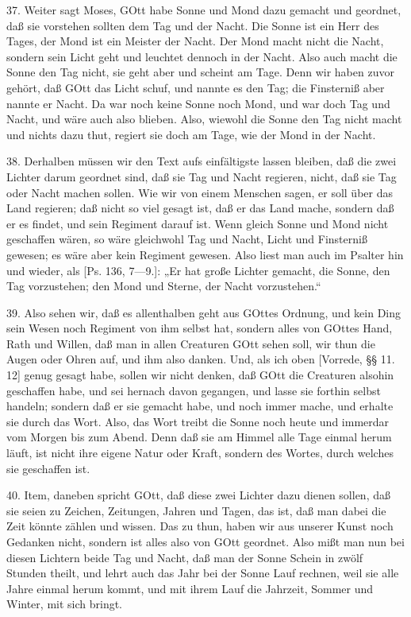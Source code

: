37. Weiter sagt Moses, GOtt habe Sonne und Mond dazu gemacht und geordnet, daß sie vorstehen sollten dem Tag und der Nacht. Die Sonne ist ein Herr des Tages, der Mond ist ein Meister der Nacht. Der Mond macht nicht die Nacht, sondern sein Licht geht und leuchtet dennoch in der Nacht. Also auch macht die Sonne den Tag nicht, sie geht aber und scheint am Tage. Denn wir haben zuvor gehört, daß GOtt das Licht schuf, und nannte es den Tag; die Finsterniß aber nannte er Nacht. Da war noch keine Sonne noch Mond, und war doch Tag und Nacht, und wäre auch also blieben. Also, wiewohl die Sonne den Tag nicht macht und nichts dazu thut, regiert sie doch am Tage, wie der Mond in der Nacht.

38. Derhalben müssen wir den Text aufs einfältigste lassen bleiben, daß die zwei Lichter darum geordnet sind, daß sie Tag und Nacht regieren, nicht, daß sie Tag oder Nacht machen sollen. Wie wir von einem Menschen sagen, er soll über das Land regieren; daß nicht so viel gesagt ist, daß er das Land mache, sondern daß er es findet, und sein Regiment darauf ist. Wenn gleich Sonne und Mond nicht geschaffen wären, so wäre gleichwohl Tag und Nacht, Licht und Finsterniß gewesen; es wäre aber kein Regiment gewesen. Also liest man auch im Psalter hin und wieder, als [Ps. 136, 7—9.]: „Er hat große Lichter gemacht, die Sonne, den Tag vorzustehen; den Mond und Sterne, der Nacht vorzustehen.“

39. Also sehen wir, daß es allenthalben geht aus GOttes Ordnung, und kein Ding sein Wesen noch Regiment von ihm selbst hat, sondern alles von GOttes Hand, Rath und Willen, daß man in allen Creaturen GOtt sehen soll, wir thun die Augen oder Ohren auf, und ihm also danken. Und, als ich oben [Vorrede, §§ 11. 12] genug gesagt habe, sollen wir nicht denken, daß GOtt die Creaturen alsohin geschaffen habe, und sei hernach davon gegangen, und lasse sie forthin selbst handeln; sondern daß er sie gemacht habe, und noch immer mache, und erhalte sie durch das Wort. Also, das Wort treibt die Sonne noch heute und immerdar vom Morgen bis zum Abend. Denn daß sie am Himmel alle Tage einmal herum läuft, ist nicht ihre eigene Natur oder Kraft, sondern des Wortes, durch welches sie geschaffen ist.

40. Item, daneben spricht GOtt, daß diese zwei Lichter dazu dienen sollen, daß sie seien zu Zeichen, Zeitungen, Jahren und Tagen, das ist, daß man dabei die Zeit könnte zählen und wissen. Das zu thun, haben wir aus unserer Kunst noch Gedanken nicht, sondern ist alles also von GOtt geordnet. Also mißt man nun bei diesen Lichtern beide Tag und Nacht, daß man der Sonne Schein in zwölf Stunden theilt, und lehrt auch das Jahr bei der Sonne Lauf rechnen, weil sie alle Jahre einmal herum kommt, und mit ihrem Lauf die Jahrzeit, Sommer und Winter, mit sich bringt.

